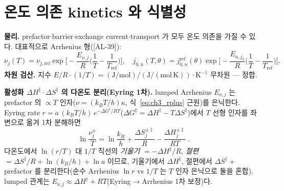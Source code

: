 \documentclass[11pt,a4paper]{article}
\newcommand{\AL}[1]{\textsf{[AL-#1]}}
\begin{document}
\section{온도 의존 kinetics 와 식별성}\label{sec:ch3_ident}
\textbf{물리.} prefactor$\cdot$barrier$\cdot$exchange current$\cdot$transport 가 모두 온도 의존을 가질 수 있다.
대표적으로 Arrhenius 형(\AL{39}):
\begin{equation}
\nu_j(T)=\nu_{j,\mathrm{ref}}\exp\!\Big[-\frac{E_{\nu,j}}{R}\Big(\frac1T-\frac1{T_{\mathrm{ref}}}\Big)\Big],\quad
j_{0,n}(T,\theta)=j_{0,n}^{\mathrm{ref}}(\theta)\exp\!\Big[-\frac{E_{a,j_0}}{R}\Big(\frac1T-\frac1{T_{\mathrm{ref}}}\Big)\Big].
\label{eq:ch3_T}
\end{equation}
\textbf{차원 검산.} 지수 $E/R\cdot(1/T)=\mathrm{(J/mol)}/\mathrm{(J/(mol\,K))}\cdot\mathrm{K^{-1}}$ 무차원 — 정합.

\textbf{활성화 $\Delta H^\ddagger\cdot\Delta S^\ddagger$ 의 다온도 분리(Eyring 1차).} lumped Arrhenius $E_{\nu,j}$ 는
prefactor 의 $\propto T$ 인자($\nu=(k_BT/h)\kappa$, 식~\eqref{eq:ch3_rplus} 근원)를 은닉한다. Eyring rate
$r=a\,(k_BT/h)\,e^{-\Delta G^\ddagger/RT}$($\Delta G^\ddagger=\Delta H^\ddagger-T\Delta S^\ddagger$)에서 $T$
선형 인자를 좌변으로 옮겨 1차 분해하면
\begin{equation}
\boxed{\;\ln\frac{\nu_j^\pm}{T}=\ln\frac{k_B}{h}+\frac{\Delta S_j^{\pm\ddagger}}{R}-\frac{\Delta H_j^{\pm\ddagger}}{RT}\;.}
\label{eq:ch3_eyring}
\end{equation}
다온도에서 $\ln(r/T)$ 대 $1/T$ 직선의 \emph{기울기} $=-\Delta H^\ddagger/R$, \emph{절편}
$=\Delta S^\ddagger/R+\ln(k_B/h)+\ln a$ 이므로, 기울기에서 $\Delta H^\ddagger$, 절편에서
$\Delta S^\ddagger+$prefactor 를 분리한다(순수 Arrhenius $\ln r$ vs $1/T$ 는 $T$ 인자 은닉으로 둘을 혼합).
lumped 관계는 $E_{\nu,j}\approx\Delta H^\ddagger+RT$(Eyring$\to$Arrhenius 1차 보정)다.
\end{document}

